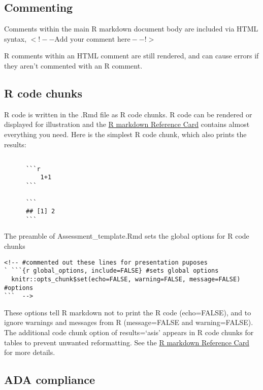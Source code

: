 \documentclass[12pt,]{article}
\begin{document}
\subsection{Commenting}\label{commenting}

Comments within the main R markdown document body are included via HTML
syntax, \(<!-- \text{Add your comment here} --!>\)

R comments within an HTML comment are still rendered, and can cause
errors if they aren't commented with an R comment.

\subsection{R code chunks}\label{r-code-chunks}

R code is written in the .Rmd file as R code chunks. R code can be
rendered or displayed for illustration and the
\href{https://www.rstudio.com/wp-content/uploads/2015/03/rmarkdown-reference.pdf}{R
markdown Reference Card} contains almost everything you need. Here is
the simplest R code chunk, which also prints the results:

\begin{Verbatim}[frame=single]
      
      ```r
          1+1
      ```
      
      ```
      ## [1] 2
      ```
\end{Verbatim}

The preamble of Assessment\_template.Rmd sets the global options for R
code chunks

\begin{Verbatim}[frame=single]
<!-- #commented out these lines for presentation puposes
` ```{r global_options, include=FALSE} #sets global options 
  knitr::opts_chunk$set(echo=FALSE, warning=FALSE, message=FALSE) #options
```  -->
\end{Verbatim}

These options tell R markdown not to print the R code (echo=FALSE), and
to ignore warnings and messages from R (message=FALSE and
warning=FALSE). The additional code chunk option of results=`asis'
appears in R code chunks for tables to prevent unwanted reformatting.
See the
\href{https://www.rstudio.com/wp-content/uploads/2015/03/rmarkdown-reference.pdf}{R
markdown Reference Card} for more details.

\subsection{ADA compliance}\label{ada-compliance}
\end{document}
